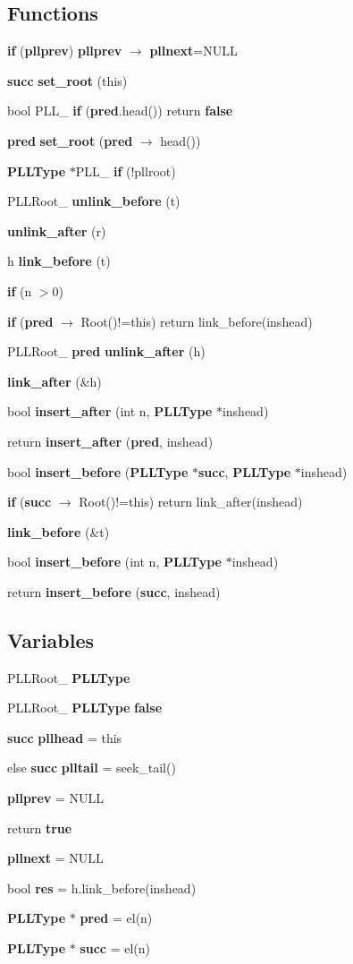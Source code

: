 \subsection*{Functions}
\begin{CompactItemize}
\item 
{\bf if} ({\bf pllprev}) {\bf pllprev} $\rightarrow$ {\bf pllnext}=NULL
\item 
{\bf succ} {\bf set\_\-root} (this)
\item 
bool PLL\_\- {\bf if} ({\bf pred}.head()) return {\bf false}
\item 
{\bf pred} {\bf set\_\-root} ({\bf pred} $\rightarrow$ head())
\item 
{\bf PLLType} $\ast$PLL\_\- {\bf if} (!pllroot)
\item 
PLLRoot\_\- {\bf unlink\_\-before} (t)
\item 
{\bf unlink\_\-after} (r)
\item 
h {\bf link\_\-before} (t)
\item 
{\bf if} (n $>$0)
\item 
{\bf if} ({\bf pred} $\rightarrow$ Root()!=this) return link\_\-before(inshead)
\item 
PLLRoot\_\- {\bf pred} {\bf unlink\_\-after} (h)
\item 
{\bf link\_\-after} (\&h)
\item 
bool {\bf insert\_\-after} (int n, {\bf PLLType} $\ast$inshead)
\item 
return {\bf insert\_\-after} ({\bf pred}, inshead)
\item 
bool {\bf insert\_\-before} ({\bf PLLType} $\ast${\bf succ}, {\bf PLLType} $\ast$inshead)
\item 
{\bf if} ({\bf succ} $\rightarrow$ Root()!=this) return link\_\-after(inshead)
\item 
{\bf link\_\-before} (\&t)
\item 
bool {\bf insert\_\-before} (int n, {\bf PLLType} $\ast$inshead)
\item 
return {\bf insert\_\-before} ({\bf succ}, inshead)
\end{CompactItemize}
\subsection*{Variables}
\begin{CompactItemize}
\item 
PLLRoot\_\- {\bf PLLType}
\item 
PLLRoot\_\- {\bf PLLType} {\bf false}
\item 
{\bf succ} {\bf pllhead} = this
\item 
else {\bf succ} {\bf plltail} = seek\_\-tail()
\item 
{\bf pllprev} = NULL
\item 
return {\bf true}
\item 
{\bf pllnext} = NULL
\item 
bool {\bf res} = h.link\_\-before(inshead)
\item 
{\bf PLLType} $\ast$ {\bf pred} = el(n)
\item 
{\bf PLLType} $\ast$ {\bf succ} = el(n)
\end{CompactItemize}



